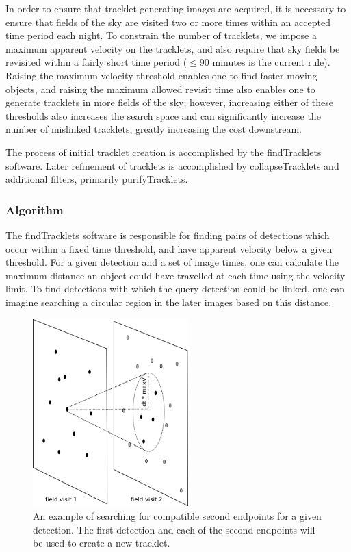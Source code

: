 In order to ensure that tracklet-generating images are acquired, it is
necessary to ensure that fields of the sky are visited two or more
times within an accepted time period each night. To constrain the
number of tracklets, we impose a maximum apparent velocity on the
tracklets, and also require that sky fields be revisited within a
fairly short time period ($\leq 90$ minutes is the current rule).
Raising the maximum velocity threshold enables one to find
faster-moving objects, and raising the maximum allowed revisit time
also enables one to generate tracklets in more fields of the sky;
however, increasing either of these thresholds also increases the
search space and can significantly increase the number of mislinked
tracklets, greatly increasing the cost downstream.

The process of initial tracklet creation is accomplished by the
findTracklets software.  Later refinement of tracklets is accomplished
by collapseTracklets and additional filters, primarily purifyTracklets. 

\subsubsection{Algorithm} 

The findTracklets software is responsible for finding pairs of
detections which occur within a fixed time threshold, and have
apparent velocity below a given threshold.  For a given detection and
a set of image times, one can calculate the maximum distance an object
could have travelled at each time using the velocity limit.  To find
detections with which the query detection could be linked, one can
imagine searching a circular region in the later images based on this
distance.

\begin{figure}[ht]
  \centering
    \includegraphics[width=6cm]{illustrations/findTracklets-onequery.png}
    \caption[An example of findTracklets endpoints.]{An example of searching for compatible second endpoints
      for a given detection.  The first detection and each of the
      second endpoints will be used to create a new tracklet.}
\label{findTrackletsIllustrated}
\end{figure}


